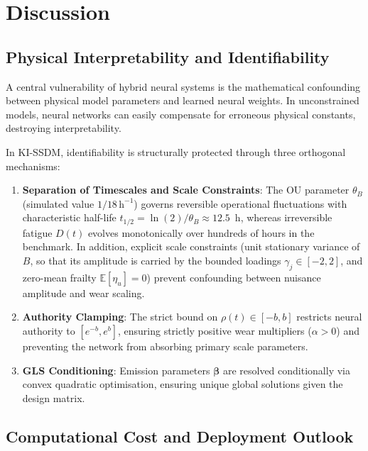 \documentclass[a4paper,fleqn]{cas-dc}
\begin{document}
\section{Discussion}
\label{sec:discussion}

\subsection{Physical Interpretability and Identifiability}
\label{subsec:disc_identifiability}

A central vulnerability of hybrid neural systems is the mathematical confounding between physical model parameters and learned neural weights. In unconstrained models, neural networks can easily compensate for erroneous physical constants, destroying interpretability.

In KI-SSDM, identifiability is structurally protected through three orthogonal mechanisms:
\begin{enumerate}[label=(\roman*),leftmargin=2.2em]
    \item \textbf{Separation of Timescales and Scale Constraints}: The OU parameter $\theta_B$ (simulated value $1/18\,\mathrm{h}^{-1}$) governs reversible operational fluctuations with characteristic half-life $t_{1/2} = \ln(2)/\theta_B \approx 12.5$~h, whereas irreversible fatigue $D(t)$ evolves monotonically over hundreds of hours in the benchmark. In addition, explicit scale constraints (unit stationary variance of $B$, so that its amplitude is carried by the bounded loadings $\gamma_j \in [-2, 2]$, and zero-mean frailty $\mathbb{E}[\eta_u] = 0$) prevent confounding between nuisance amplitude and wear scaling.
    \item \textbf{Authority Clamping}: The strict bound on $\rho(t) \in [-b, b]$ restricts neural authority to $[e^{-b}, e^b]$, ensuring strictly positive wear multipliers ($\alpha > 0$) and preventing the network from absorbing primary scale parameters.
    \item \textbf{GLS Conditioning}: Emission parameters $\boldsymbol{\beta}$ are resolved conditionally via convex quadratic optimisation, ensuring unique global solutions given the design matrix.
\end{enumerate}

\subsection{Computational Cost and Deployment Outlook}
\label{subsec:edge_deployment}
\end{document}
